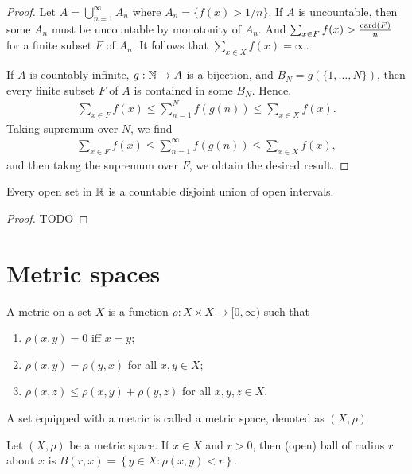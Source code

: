 \begin{proof}
    Let $A = \bigcup_{n=1}^{\infty} A_n$ where $A_n = \{ f(x) > 1/n \}$.
    If $A$ is uncountable, then some $A_n$ must be uncountable by monotonity of $A_n$.
    And $\sum_{x \in F} f(x) > \frac{\mathrm{card} (F)}{n}$ for a finite subset $F$ of $A_n$.
    It follows that $\sum_{x \in X} f(x) = \infty$.

    If $A$ is countably infinite, $g: \mathbb{N} \to A$ is a bijection, and $B_N = g(\{ 1, \dots, N \})$, then every finite subset $F$ of $A$ is contained in some $B_N$.
    Hence, 
    \begin{align}
        \sum_{x \in F} f(x) \le \sum_{n=1}^{N} f(g(n)) \le \sum_{x \in X} f(x).
    \end{align}
    Taking supremum over $N$, we find
    \begin{align}
        \sum_{x \in F} f(x) \le \sum_{n=1}^{\infty} f(g(n)) \le \sum_{x \in X} f(x),
    \end{align}
    and then takng the supremum over $F$, we obtain the desired result. 
\end{proof}

\begin{proposition}
    Every open set in $\mathbb{R}$ is a countable disjoint union of open intervals.
\end{proposition}

\begin{proof}
    TODO
\end{proof}

\section{Metric spaces}

\begin{definition}
    A metric on a set $X$ is a function $\rho : X \times X \to [0, \infty)$ such that
    \begin{enumerate}
        \item $\rho(x, y) = 0$ iff $x = y$;
        \item $\rho(x, y) = \rho(y, x)$ for all $x, y \in X$;
        \item $\rho(x, z) \le \rho (x, y) + \rho(y, z)$ for all $x, y, z \in X$.
    \end{enumerate}
    A set equipped with a metric is called a metric space, denoted as $(X, \rho)$
\end{definition}

\begin{definition}
    Let $(X, \rho)$ be a metric space.
    If $x \in X$ and $r > 0$, then (open) ball of radius $r$ about $x$ is $B(r, x) = \left\{ y \in X: \rho(x, y) < r \right\}$.
\end{definition}

